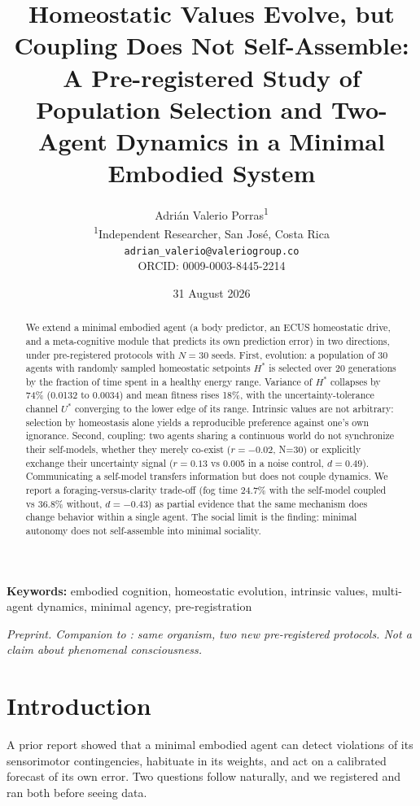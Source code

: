 \documentclass[11pt,a4paper]{article}
\title{Homeostatic Values Evolve, but Coupling Does Not Self-Assemble: A Pre-registered Study of Population Selection and Two-Agent Dynamics in a Minimal Embodied System}
\author{Adri\'an Valerio Porras\textsuperscript{1} \\ \small \textsuperscript{1}Independent Researcher, San Jos\'e, Costa Rica \\ \small \texttt{adrian\_valerio@valeriogroup.co} \\ \small ORCID: 0009-0003-8445-2214 }
\date{31 August 2026}
\begin{document}
\maketitle

\begin{abstract}
We extend a minimal embodied agent (a body predictor, an ECUS homeostatic drive, and a meta-cognitive module that predicts its own prediction error) in two directions, under pre-registered protocols with $N=30$ seeds. First, evolution: a population of 30 agents with randomly sampled homeostatic setpoints $H^*$ is selected over 20 generations by the fraction of time spent in a healthy energy range. Variance of $H^*$ collapses by 74\% (0.0132 to 0.0034) and mean fitness rises 18\%, with the uncertainty-tolerance channel $U^*$ converging to the lower edge of its range. Intrinsic values are not arbitrary: selection by homeostasis alone yields a reproducible preference against one's own ignorance. Second, coupling: two agents sharing a continuous world do not synchronize their self-models, whether they merely co-exist ($r=-0.02$, N=30) or explicitly exchange their uncertainty signal ($r=0.13$ vs 0.005 in a noise control, $d=0.49$). Communicating a self-model transfers information but does not couple dynamics. We report a foraging-versus-clarity trade-off (fog time 24.7\% with the self-model coupled vs 36.8\% without, $d=-0.43$) as partial evidence that the same mechanism does change behavior within a single agent. The social limit is the finding: minimal autonomy does not self-assemble into minimal sociality.
\end{abstract}

\noindent\textbf{Keywords:} embodied cognition, homeostatic evolution, intrinsic values, multi-agent dynamics, minimal agency, pre-registration

\noindent\textit{Preprint. Companion to \cite{v012}: same organism, two new pre-registered protocols. Not a claim about phenomenal consciousness.}

\section{Introduction}

A prior report \cite{v012} showed that a minimal embodied agent can detect violations of its sensorimotor contingencies, habituate in its weights, and act on a calibrated forecast of its own error. Two questions follow naturally, and we registered and ran both before seeing data.
\end{document}
